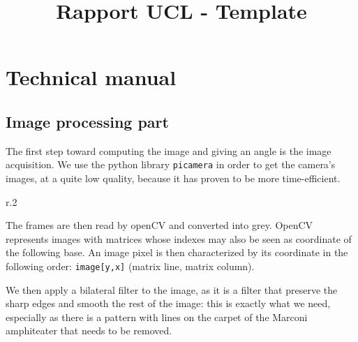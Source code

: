 \documentclass{rapport}
\title{Rapport UCL - Template} %
\begin{document}



        
\fairemarges %
\fairepagedegarde %
\tableofcontents%
\newpage


\section{Technical manual}

\subsection{Image processing part}

The first step toward computing the image and giving an angle is the image acquisition. We use the python library \verb|picamera| in order to get the camera's images, at a quite low quality, because it has proven to be more time-efficient.

\begin{wrapfigure}[6]{r}{.2\textwidth}
\vspace{-5mm}
\end{wrapfigure}

The frames are then read by openCV and converted into grey. OpenCV represents images with matrices whose indexes may also be seen as coordinate of the following base. An image pixel is then characterized by its coordinate in the following order: \verb|image[y,x]| (matrix line, matrix column).

We then apply a bilateral filter to the image, as it is a filter that preserve the sharp edges and smooth the rest of the image: this is exactly what we need, especially as there is a pattern with lines on the carpet of the Marconi amphiteater that needs to be removed.
\end{document}

